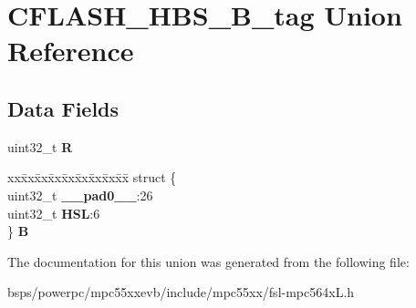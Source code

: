 \hypertarget{unionCFLASH__HBS__32B__tag}{}\section{C\+F\+L\+A\+S\+H\+\_\+\+H\+B\+S\+\_\+B\+\_\+tag Union Reference}
\label{unionCFLASH__HBS__32B__tag}
\subsection*{Data Fields}
\begin{DoxyCompactItemize}
\item 
\mbox{\label{unionCFLASH__HBS__32B__tag_a180b2bfd997fa6d647c394c6505e720f}} 
uint32\+\_\+t {\bfseries R}
\item 
\mbox{\label{unionCFLASH__HBS__32B__tag_a76a8914f94e80da290024869a97c0543}} 
\begin{tabbing}
xx\=xx\=xx\=xx\=xx\=xx\=xx\=xx\=xx\=\kill
struct \{\\
\>uint32\_t {\bfseries \_\_pad0\_\_}:26\\
\>uint32\_t {\bfseries HSL}:6\\
\} {\bfseries B}\\

\end{tabbing}\end{DoxyCompactItemize}


The documentation for this union was generated from the following file\+:\begin{DoxyCompactItemize}
\item 
bsps/powerpc/mpc55xxevb/include/mpc55xx/fsl-\/mpc564x\+L.\+h\end{DoxyCompactItemize}
